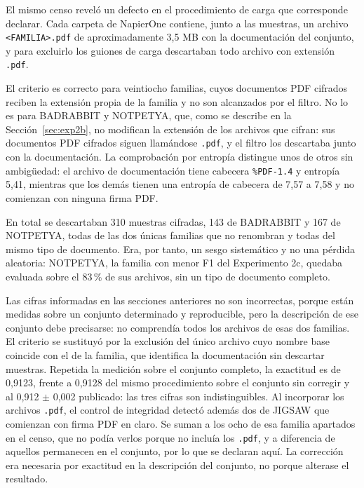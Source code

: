 El mismo censo reveló un defecto en el procedimiento de carga que corresponde declarar. Cada carpeta de NapierOne contiene, junto a las muestras, un archivo \texttt{<FAMILIA>.pdf} de aproximadamente 3,5 MB con la documentación del conjunto, y para excluirlo los guiones de carga descartaban todo archivo con extensión \texttt{.pdf}.

El criterio es correcto para veintiocho familias, cuyos documentos PDF cifrados reciben la extensión propia de la familia y no son alcanzados por el filtro. No lo es para BADRABBIT y NOTPETYA, que, como se describe en la Sección~\ref{sec:exp2b}, no modifican la extensión de los archivos que cifran: sus documentos PDF cifrados siguen llamándose \texttt{.pdf}, y el filtro los descartaba junto con la documentación. La comprobación por entropía distingue unos de otros sin ambigüedad: el archivo de documentación tiene cabecera \texttt{\%PDF-1.4} y entropía 5,41, mientras que los demás tienen una entropía de cabecera de 7,57 a 7,58 y no comienzan con ninguna firma PDF.

En total se descartaban 310 muestras cifradas, 143 de BADRABBIT y 167 de NOTPETYA, todas de las dos únicas familias que no renombran y todas del mismo tipo de documento. Era, por tanto, un sesgo sistemático y no una pérdida aleatoria: NOTPETYA, la familia con menor F1 del Experimento 2c, quedaba evaluada sobre el 83\,\% de sus archivos, sin un tipo de documento completo.

Las cifras informadas en las secciones anteriores no son incorrectas, porque están medidas sobre un conjunto determinado y reproducible, pero la descripción de ese conjunto debe precisarse: no comprendía todos los archivos de esas dos familias. El criterio se sustituyó por la exclusión del único archivo cuyo nombre base coincide con el de la familia, que identifica la documentación sin descartar muestras. Repetida la medición sobre el conjunto completo, la exactitud es de 0,9123, frente a 0,9128 del mismo procedimiento sobre el conjunto sin corregir y al 0,912 $\pm$ 0,002 publicado: las tres cifras son indistinguibles. Al incorporar los archivos \texttt{.pdf}, el control de integridad detectó además dos de JIGSAW que comienzan con firma PDF en claro. Se suman a los ocho de esa familia apartados en el censo, que no podía verlos porque no incluía los \texttt{.pdf}, y a diferencia de aquellos permanecen en el conjunto, por lo que se declaran aquí. La corrección era necesaria por exactitud en la descripción del conjunto, no porque alterase el resultado.

